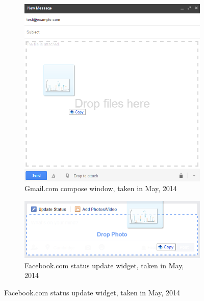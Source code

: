 	\begin{figure}[h]
		\centering
		\begin{subfigure}[b]{0.4\textwidth}
			\includegraphics[width=\textwidth]{dropexample1}
			\caption{Gmail.com compose window, taken in May, 2014}
			\label{fig:dropexample1}
		\end{subfigure}
		\begin{subfigure}[b]{0.4\textwidth}
			\includegraphics[width=\textwidth]{dropexample2}
			\caption{Facebook.com status update widget, taken in May, 2014}
			\label{fig:dropexample2}
		\end{subfigure}

	\end{figure}